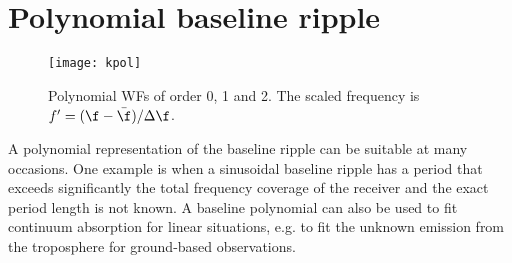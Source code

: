 \section{Polynomial baseline ripple}
 
 \begin{figure}
  \begin{center}
   \begin{minipage}[c]{0.62\textwidth}
    \centering
    \texttt{[image: kpol]}
   \end{minipage}%
   \hspace{0.03\textwidth}%
   \begin{minipage}[c]{0.35\textwidth}
    \centering
    \caption{Polynomial WFs of order 0, 1 and 2. The scaled frequency is 
             $f'=(\f-\bar{\f})/\Delta \f$.}
   \end{minipage}
  \end{center}
 \end{figure}           

 A polynomial representation of the baseline ripple can be suitable
 at many occasions. One example is when a sinusoidal baseline ripple 
 has a period that exceeds significantly the total frequency coverage
 of the receiver and the exact period length is not known. A baseline
 polynomial can also be used to fit continuum absorption for linear
 situations, e.g. to fit the unknown emission from the troposphere
 for ground-based observations.

